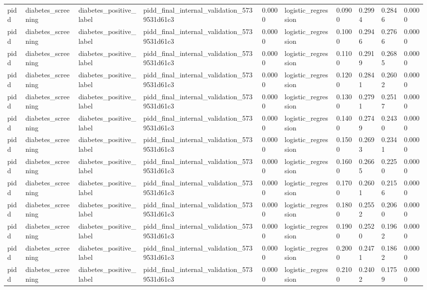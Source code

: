 \begin{tabular}{llllllllll}
pidd & diabetes\_screening & diabetes\_positive\_label & pidd\_final\_internal\_validation\_5739531d61c3 & 0.0000 & logistic\_regression & 0.0900 & 0.2994 & 0.2846 & 0.0000 \\
pidd & diabetes\_screening & diabetes\_positive\_label & pidd\_final\_internal\_validation\_5739531d61c3 & 0.0000 & logistic\_regression & 0.1000 & 0.2946 & 0.2766 & 0.0000 \\
pidd & diabetes\_screening & diabetes\_positive\_label & pidd\_final\_internal\_validation\_5739531d61c3 & 0.0000 & logistic\_regression & 0.1100 & 0.2919 & 0.2685 & 0.0000 \\
pidd & diabetes\_screening & diabetes\_positive\_label & pidd\_final\_internal\_validation\_5739531d61c3 & 0.0000 & logistic\_regression & 0.1200 & 0.2841 & 0.2602 & 0.0000 \\
pidd & diabetes\_screening & diabetes\_positive\_label & pidd\_final\_internal\_validation\_5739531d61c3 & 0.0000 & logistic\_regression & 0.1300 & 0.2791 & 0.2517 & 0.0000 \\
pidd & diabetes\_screening & diabetes\_positive\_label & pidd\_final\_internal\_validation\_5739531d61c3 & 0.0000 & logistic\_regression & 0.1400 & 0.2749 & 0.2430 & 0.0000 \\
pidd & diabetes\_screening & diabetes\_positive\_label & pidd\_final\_internal\_validation\_5739531d61c3 & 0.0000 & logistic\_regression & 0.1500 & 0.2693 & 0.2341 & 0.0000 \\
pidd & diabetes\_screening & diabetes\_positive\_label & pidd\_final\_internal\_validation\_5739531d61c3 & 0.0000 & logistic\_regression & 0.1600 & 0.2665 & 0.2250 & 0.0000 \\
pidd & diabetes\_screening & diabetes\_positive\_label & pidd\_final\_internal\_validation\_5739531d61c3 & 0.0000 & logistic\_regression & 0.1700 & 0.2601 & 0.2156 & 0.0000 \\
pidd & diabetes\_screening & diabetes\_positive\_label & pidd\_final\_internal\_validation\_5739531d61c3 & 0.0000 & logistic\_regression & 0.1800 & 0.2552 & 0.2060 & 0.0000 \\
pidd & diabetes\_screening & diabetes\_positive\_label & pidd\_final\_internal\_validation\_5739531d61c3 & 0.0000 & logistic\_regression & 0.1900 & 0.2520 & 0.1962 & 0.0000 \\
pidd & diabetes\_screening & diabetes\_positive\_label & pidd\_final\_internal\_validation\_5739531d61c3 & 0.0000 & logistic\_regression & 0.2000 & 0.2471 & 0.1862 & 0.0000 \\
pidd & diabetes\_screening & diabetes\_positive\_label & pidd\_final\_internal\_validation\_5739531d61c3 & 0.0000 & logistic\_regression & 0.2100 & 0.2402 & 0.1759 & 0.0000 \\

\end{tabular}
